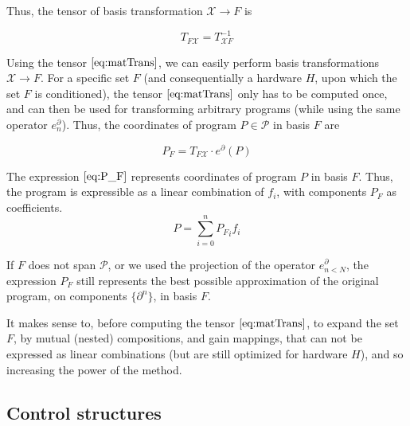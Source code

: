 \documentclass{article}
\newcommand{\X}{\mathcal{X}}
\newcommand{\dP}{\mathcal{P}}
\newcommand{\D}{\partial}
\begin{document}
  Thus, the tensor of basis transformation $\X\to F$ is
  
  \begin{equation}\label{eq:matTrans}
  T_{F\X}=T_{\X F}^{-1}
  \end{equation}
  
  Using the tensor $\eqref{eq:matTrans}$, we can easily perform basis transformations $\X\to F$. For a specific set $F$ (and consequentially a hardware $H$, upon which the set $F$ is conditioned), the tensor $\eqref{eq:matTrans}$ only has to be computed once, and can then be used for transforming arbitrary programs (while using the same operator $e^\D_n$).
  Thus, the coordinates of program $P\in\dP$ in basis $F$ are
  
  \begin{equation}\label{eq:P_F}
  	P_F=T_{F\X}\cdot e^\D(P)
  \end{equation}
  
  The expression $\eqref{eq:P_F}$ represents coordinates of program $P$ in basis $F$. Thus, the program is expressible as a linear combination of $f_i$, with components $P_F$ as coefficients.
  \begin{equation}
  P=\sum\limits_{i=0}^{n}{P_F}_if_i
  \end{equation}
  
  If $F$ does not span $\dP$, or we used the projection of the operator $e^\D_{n<N}$, the expression $P_F$ still represents the best possible approximation of the original program, on components $\{\D^n\}$, in basis $F$.
  
  It makes sense to, before computing the tensor $\eqref{eq:matTrans}$, to expand the set $F$, by mutual (nested) compositions, and gain mappings, that can not be expressed as linear combinations (but are still optimized for hardware $H$), and so increasing the power of the method.
  
 \subsection{Control structures}
 
\end{document}
